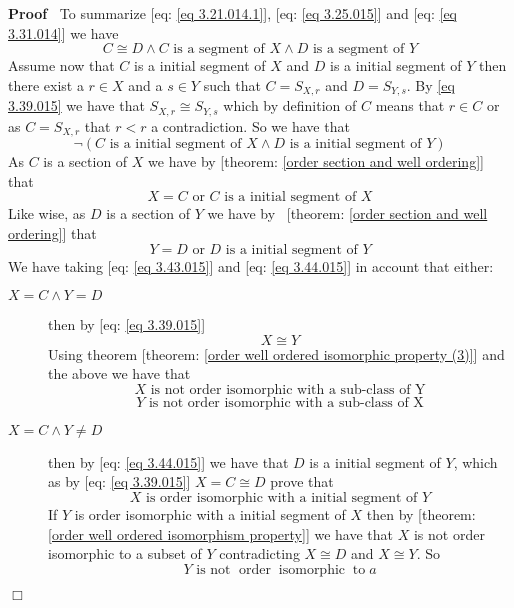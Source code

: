 \documentclass{book}
\newcommand{\tmop}[1]{\ensuremath{\operatorname{#1}}}
\newenvironment{proof}{\noindent\textbf{Proof\ }}{\hspace*{\fill}$\Box$\medskip}
\begin{document}
\begin{proof}
  To summarize [eq: \ref{eq 3.21.014.1}], [eq: \ref{eq 3.25.015}] and [eq:
  \ref{eq 3.31.014}] we have
  \begin{equation}
    \label{eq 3.39.015} C \cong D \wedge C \text{ is a segment of } X \wedge D
    \text{ is a segment of } Y
  \end{equation}
  Assume now that $C$ is a initial segment of $X$ and $D$ is a initial segment
  of $Y$ then there exist a $r \in X$ and a $s \in Y$ such that $C = S_{X, r}$
  and $D = S_{Y, s}$. By \ref{eq 3.39.015} we have that $S_{X, r} \cong S_{Y,
  s}$ which by definition of $C$ means that $r \in C$ or as $C = S_{X, r}$
  that $r < r$ a contradiction. So we have that
  \begin{equation}
    \label{eq 3.42.015} \neg \left( C \text{ is a initial segment of $X \wedge
    D \text{ is a initial segment of } Y$} \right)
  \end{equation}
  As $C$ is a section of $X$ we have by [theorem: \ref{order section and well
  ordering}] that
  \begin{equation}
    \label{eq 3.43.015} X = C \text{ or } C \text{ is a initial segment of } X
  \end{equation}
  Like wise, as $D$ is a section of $Y$ we have by \ [theorem: \ref{order
  section and well ordering}] that
  \begin{equation}
    \label{eq 3.44.015} Y = D \text{ or } D \text{ is a initial segment of } Y
  \end{equation}
  We have taking [eq: \ref{eq 3.43.015}] and [eq: \ref{eq 3.44.015}] in
  account that either:
  \begin{description}
    \item[$X = C \wedge Y = D$] then by [eq: \ref{eq 3.39.015}]
    \[ X \cong Y \]
    Using theorem [theorem: \ref{order well ordered isomorphic property (3)}]
    and the above we have that
    \[ X \text{ is not order isomorphic with a sub-class of Y} \]
    \[ Y \text{ is not order isomorphic with a sub-class of X} \]
    \item[$X = C \wedge Y \neq D$] then by [eq: \ref{eq 3.44.015}] we have
    that $D$ is a initial segment of $Y$, which as by [eq: \ref{eq 3.39.015}]
    $X = C \cong D$ prove that
    \[ X \text{ is order isomorphic with a initial segment of $Y$} \]
    If $Y$ is order isomorphic with a initial segment of $X$ then by [theorem:
    \ref{order well ordered isomorphism property}] we have that $X$ is not
    order isomorphic to a subset of $Y$ contradicting $X \cong D$ and $X \cong
    Y$. So \
    \[ Y \text{ is not } \tmop{order} \tmop{isomorphic} \tmop{to} a
\]
\end{description}
\end{proof}
\end{document}
